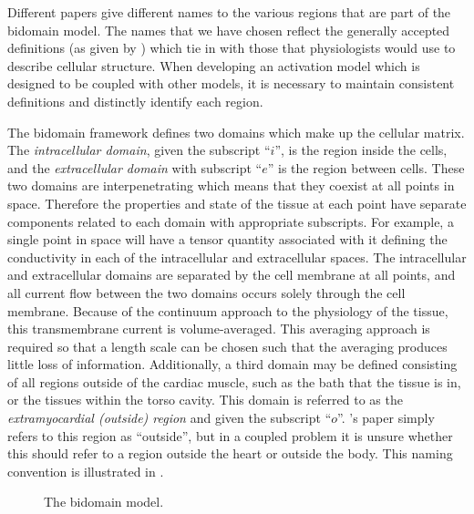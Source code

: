 Different papers give different names to the various regions that are part of
the bidomain model.  The names that we have chosen reflect the generally
accepted definitions (as given by \citet{krassowska:1994}) which tie in
with those that physiologists would use to describe cellular structure.  When
developing an activation model which is designed to be coupled with other
models, it is necessary to maintain consistent definitions and distinctly
identify each region.

The bidomain framework defines two domains which make up the cellular matrix.
The \emph{intracellular domain}, given the subscript ``$i$'', is the region
inside the cells, and the \emph{extracellular domain} with subscript ``$e$''
is the region between cells.  These two domains are interpenetrating which
means that they coexist at all points in space.  Therefore the properties and
state of the tissue at each point have separate components related to each
domain with appropriate subscripts.  For example, a single point in space will
have a tensor quantity associated with it defining the conductivity in each of
the intracellular and extracellular spaces.  The intracellular and
extracellular domains are separated by the cell membrane at all points, and
all current flow between the two domains occurs solely through the cell
membrane.  Because of the continuum approach to the physiology of the tissue,
this transmembrane current is volume-averaged.  This averaging approach is
required so that a length scale can be chosen such that the averaging produces
little loss of information.  Additionally, a third domain may be defined
consisting of all regions outside of the cardiac muscle, such as the bath that
the tissue is in, or the tissues within the torso cavity.  This domain is
referred to as the \emph{extramyocardial (outside) region} and given the
subscript ``$o$''.  \citeauthor{krassowska:1994}'s paper simply refers to
this region as ``outside'', but in a coupled problem it is unsure whether this
should refer to a region outside the heart or outside the body.  This naming
convention is illustrated in .
\begin{figure}[tb]
  \begin{center}
    \leavevmode
    
    \caption[The bidomain model]{The bidomain model.}
    \label{fig:bidomain-diagram}
  \end{center}
\end{figure}

